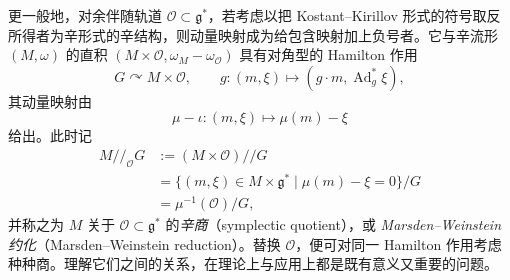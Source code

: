 更一般地，对余伴随轨道 $\mathcal{O}\subset\mathfrak{g}^*$，若考虑以把 Kostant--Kirillov 形式的符号取反所得者为辛形式的辛结构，则动量映射成为给包含映射加上负号者。它与辛流形 $(M,\omega)$ 的直积 $(M\times\mathcal{O},\omega_M-\omega_{\mathcal{O}})$ 具有对角型的 Hamilton 作用
\begin{equation}
  G\curvearrowright M\times\mathcal{O},\qquad g\colon(m,\xi)\mapsto(g\cdot m,\operatorname{Ad}^*_g\xi),
  \tag{5.2.16}
\end{equation}
其动量映射由
\begin{equation}
  \mu-\iota\colon(m,\xi)\mapsto\mu(m)-\xi
  \tag{5.2.17}
\end{equation}
给出。此时记
\begin{align}
  M/\!\!/_{\mathcal{O}}G&:=(M\times\mathcal{O})/\!\!/G \tag{5.2.18}\\
  &=\{(m,\xi)\in M\times\mathfrak{g}^*\mid\mu(m)-\xi=0\}/G \tag{5.2.19}\\
  &=\mu^{-1}(\mathcal{O})/G, \tag{5.2.20}
\end{align}
并称之为 $M$ 关于 $\mathcal{O}\subset\mathfrak{g}^*$ 的\emph{辛商}（symplectic quotient），或 \emph{Marsden--Weinstein 约化}（Marsden--Weinstein reduction）。替换 $\mathcal{O}$，便可对同一 Hamilton 作用考虑种种商。理解它们之间的关系，在理论上与应用上都是既有意义又重要的问题。


